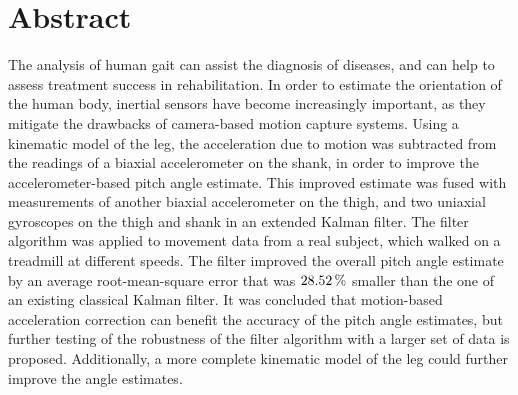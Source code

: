 \chapter{Abstract}

The analysis of human gait can assist the diagnosis of diseases, and can help to assess treatment success in rehabilitation. In order to estimate the orientation of the human body, inertial sensors have become increasingly important, as they mitigate the drawbacks of camera-based motion capture systems. Using a kinematic model of the leg, the acceleration due to motion was subtracted from the readings of a biaxial accelerometer on the shank, in order to improve the accelerometer-based pitch angle estimate. This improved estimate was fused with measurements of another biaxial accelerometer on the thigh, and two uniaxial gyroscopes on the thigh and shank in an extended Kalman filter. The filter algorithm was applied to movement data from a real subject, which walked on a treadmill at different speeds. The filter improved the overall pitch angle estimate by an average root-mean-square error that was $\unit[28.52]{\%}$ smaller than the one of an existing classical Kalman filter. It was concluded that motion-based acceleration correction can benefit the accuracy of the pitch angle estimates, but further testing of the robustness of the filter algorithm with a larger set of data is proposed. Additionally, a more complete kinematic model of the leg could further improve the angle estimates.
